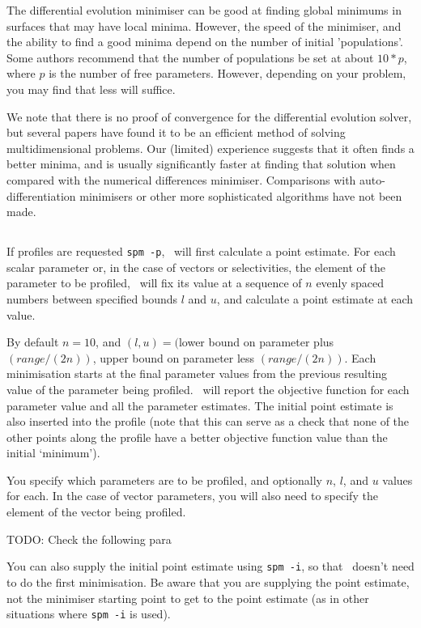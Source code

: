 The differential evolution minimiser can be good at finding global minimums in surfaces that may have local minima. However, the speed of the minimiser, and the ability to find a good minima depend on the number of initial 'populations'. Some authors recommend that the number of populations be set at about $10*p$, where $p$ is the number of free parameters. However, depending on your problem, you may find that less will suffice.

We note that there is no proof of convergence for the differential evolution solver, but several papers have found it to be an efficient method of solving multidimensional problems. Our (limited) experience suggests that it often finds a better minima, and is usually significantly faster at finding that solution when compared with the numerical differences minimiser. Comparisons with auto-differentiation minimisers or other more sophisticated algorithms have not been made. 

\subsection{\label{sec:estimate-profiles}}

If profiles are requested \texttt{spm -p}, \SPM\ will first calculate a point estimate. For each scalar parameter or, in the case of vectors or selectivities, the element of the parameter to be profiled, \SPM\ will fix its value at a sequence of $n$ evenly spaced numbers between specified bounds $l$ and $u$, and calculate a point estimate at each value. 

By default $n=10$, and $(l, u)=($lower bound on parameter plus $(range/(2n))$, upper bound on parameter less $(range/(2n))$. Each minimisation starts at the final parameter values from the previous resulting value of the parameter being profiled. \SPM\ will report the objective function for each parameter value and all the parameter estimates. The initial point estimate is also inserted into the profile (note that this can serve as a check that none of the other points along the profile have a better objective function value than the initial `minimum').

You specify which parameters are to be profiled, and optionally $n$, $l$, and $u$ values for each. In the case of vector parameters, you will also need to specify the element of the vector being profiled. 

TODO: Check the following para

You can also supply the initial point estimate using \texttt{spm -i}, so that \SPM\ doesn't need to do the first minimisation. Be aware that you are supplying the point estimate, not the minimiser starting point to get to the point estimate (as in other situations where \texttt{spm -i} is used).

